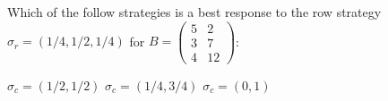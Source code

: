 \documentclass{exam}
\begin{document}
\begin{questions}
\question Which of the follow strategies is a best response to the row strategy
    \(\sigma_r=(1/4, 1/2, 1/4)\) for \(B=\begin{pmatrix}5 & 2\\ 3& 7\\ 4 &
    12\end{pmatrix}\):
    \begin{checkboxes}
        \choice
    \(
        \sigma_c = (1/2, 1/2)
    \)
        \choice
    \(
        \sigma_c = (1/4, 3/4)
    \)
        \choice
    \(
        \sigma_c = (0, 1)
    \)
\end{checkboxes}

\end{questions}
\end{document}
